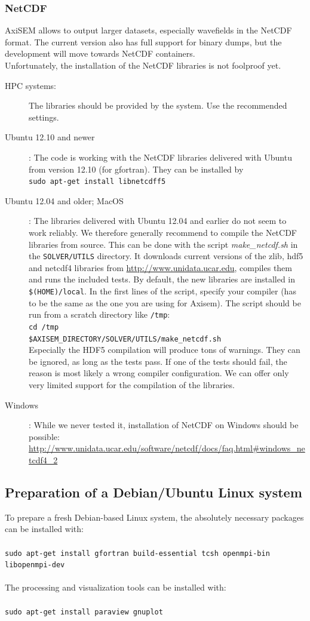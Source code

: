 \documentclass{article}
\begin{document}
\subsubsection{NetCDF}
AxiSEM allows to output larger datasets, especially wavefields in the NetCDF format. The current version also has full support for binary dumps, but the development will move towards NetCDF containers.\\
Unfortunately, the installation of the NetCDF libraries is not foolproof yet.
\begin{description}
 \item[HPC systems:] The libraries should be provided by the system. Use the recommended settings.
 \item[Ubuntu 12.10 and newer]: The code is working with the NetCDF libraries delivered with Ubuntu from version 12.10 (for gfortran). They can be installed by \\
 \verb|sudo apt-get install libnetcdff5|
 \item[Ubuntu 12.04 and older; MacOS]: The libraries delivered with Ubuntu 12.04 and earlier do not seem to work reliably. We therefore generally recommend to compile the NetCDF libraries from source. This can be done with the script \textit{make\_netcdf.sh} in the \verb|SOLVER/UTILS| directory. It downloads current versions of the zlib, hdf5 and netcdf4 libraries from \url{http://www.unidata.ucar.edu}, compiles them and runs the included tests. By default, the new libraries are installed in \verb|$(HOME)/local|. In the first lines of the script, specify your compiler (has to be the same as the one you are using for Axisem). The script should be run from a scratch directory like \verb|/tmp|:\\
 \verb|cd /tmp|\\
 \verb|$AXISEM_DIRECTORY/SOLVER/UTILS/make_netcdf.sh|\\
 Especially the HDF5 compilation will produce tons of warnings. They can be ignored, as long as the tests pass. If one of the tests should fail, the reason is most likely a wrong compiler configuration. We can offer only very limited support for the compilation of the libraries. 
 \item[Windows]: While we never tested it, installation of NetCDF on Windows should be possible:
 \url{http://www.unidata.ucar.edu/software/netcdf/docs/faq.html#windows_netcdf4_2}
\end{description}

\subsection{Preparation of a Debian/Ubuntu Linux system}
To prepare a fresh Debian-based Linux system, the absolutely necessary packages can be installed with:\\ \\
 \verb|sudo apt-get install gfortran build-essential tcsh openmpi-bin libopenmpi-dev|\\ \\
The processing and visualization tools can be installed with:\\ \\
 \verb|sudo apt-get install paraview gnuplot|
\end{document}
